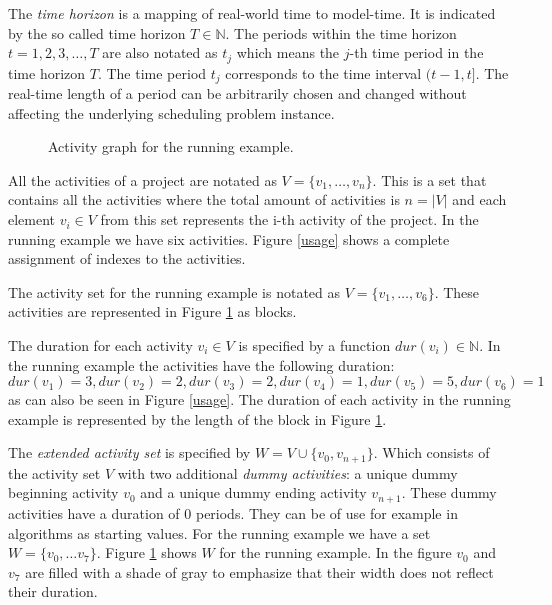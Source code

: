 \documentclass{article}
\theoremstyle{definition}
\newcommand{\inputtikz}[1]{}
\newcommand{\dur}[1]{\ensuremath{dur(v_{#1})}} %
\begin{document}
The \emph{time horizon} is a mapping of real-world time to model-time. It is indicated by the so called time horizon $T \in \mathbb{N}$.
The periods within the time horizon $t=1,2,3,\ldots,T$ are also notated as $t_j$ which means the $j$-th time period in the time horizon $T$. 
The time period $t_j$ corresponds to the time interval $(t-1,t]$. 
The real-time length of a period can be arbitrarily chosen and changed without affecting the underlying scheduling problem instance. 

\begin{figure}[ht]
	\centering
	\inputtikz{activity_graph}
	\caption{Activity graph for the running example.}
	\label{fig:activity_graph}
\end{figure}


All the activities of a project are notated as $V = \{v_1, \ldots, v_n\}$.
This is a set that contains all the activities where the total amount of activities is $n = |V|$ and each element $v_i \in V$ from this set represents the i-th activity of the project.
In the running example we have six activities. Figure \ref{usage} shows a complete assignment of indexes to the activities. 

The activity set for the running example is notated as $V = \{v_1, \ldots, v_6\}$. 
These activities are represented in Figure \ref{fig:activity_graph} as blocks.

The duration for each activity $v_i \in V$ is specified by a function $\dur{i} \in \mathbb{N}$.
In the running example the activities have the following duration: $\dur{1} = 3, \dur{2} = 2, \dur{3} = 2, \dur{4} = 1, \dur{5} = 5, \dur{6} = 1$ as can also be seen in Figure \ref{usage}. 
The duration of each activity in the running example is represented by the length of the block in Figure \ref{fig:activity_graph}.

The \emph{extended activity set} is specified by $W = V \cup \{v_0, v_{n+1}\}$.
Which consists of the activity set $V$ with two additional \emph{dummy activities}: a unique dummy beginning activity $v_0$ and a unique dummy ending activity $v_{n+1}$. 
These dummy activities have a duration of $0$ periods. 
They can be of use for example in algorithms as starting values. 
For the running example we have a set $W = \{v_0, \ldots v_7\}$.
Figure \ref{fig:activity_graph} shows $W$ for the running example.
In the figure $v_0$ and $v_7$ are filled with a shade of gray to emphasize that their width does not reflect their duration. 
\end{document}
